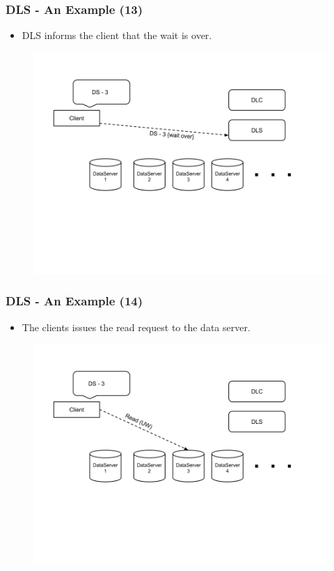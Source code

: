 \documentclass{beamer}
\begin{document}
\begin{frame}
  \frametitle{DLS - An Example (13)}
  \begin{itemize}
  \item DLS informs the client that the wait is over.
\newline
  \end{itemize}
  \begin{figure}
    \begin{center}
      \centerline{\includegraphics[scale=0.35]{img/DLS_Example10.png}}
    \end{center}
  \end{figure}
\end{frame}


\begin{frame}
  \frametitle{DLS - An Example (14)}
  \begin{itemize}
  \item The clients issues the read request to the data server.
\newline
  \end{itemize}
  \begin{figure}
    \begin{center}
      \centerline{\includegraphics[scale=0.35]{img/DLS_Example11.png}}
    \end{center}
  \end{figure}
\end{frame}
\end{document}

